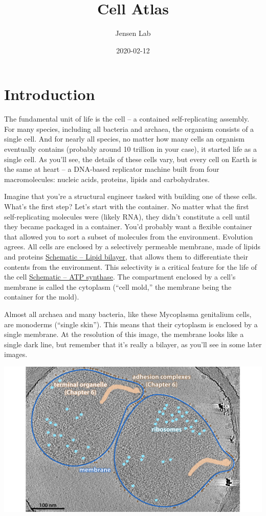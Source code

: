 \documentclass[]{tufte-book}
\title{Cell Atlas}
\author{Jensen Lab}
\date{2020-02-12}
\begin{document}
\maketitle



{
\setcounter{tocdepth}{1}
\tableofcontents
}

\hypertarget{bilayer}{\chapter{Introduction}\label{bilayer}}

The fundamental unit of life is the cell -- a contained self-replicating
assembly. For many species, including all bacteria and archaea, the
organism consists of a single cell. And for nearly all species, no
matter how many cells an organism eventually contains (probably around
10 trillion in your case), it started life as a single cell. As you'll
see, the details of these cells vary, but every cell on Earth is the
same at heart -- a DNA-based replicator machine built from four
macromolecules: nucleic acids, proteins, lipids and carbohydrates.

Imagine that you're a structural engineer tasked with building one of
these cells. What's the first step? Let's start with the container. No
matter what the first self-replicating molecules were (likely RNA), they
didn't constitute a cell until they became packaged in a container.
You'd probably want a flexible container that allowed you to sort a
subset of molecules from the environment. Evolution agrees. All cells
are enclosed by a selectively permeable membrane, made of lipids and
proteins \protect\hyperlink{bilayer}{Schematic -- Lipid bilayer}, that
allows them to differentiate their contents from the environment. This
selectivity is a critical feature for the life of the cell
\protect\hyperlink{atp}{Schematic -- ATP synthase}. The compartment
enclosed by a cell's membrane is called the cytoplasm (``cell mold,''
the membrane being the container for the mold).

Almost all archaea and many bacteria, like these Mycoplasma genitalium
cells, are monoderms (``single skin''). This means that their cytoplasm
is enclosed by a single membrane. At the resolution of this image, the
membrane looks like a single dark line, but remember that it's really a
bilayer, as you'll see in some later images.

\includegraphics{img/02_static/2_1_Mgenitalium}
\end{document}
